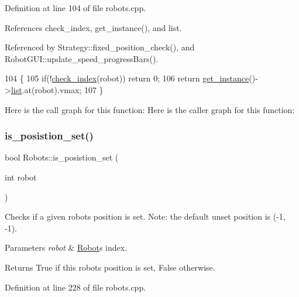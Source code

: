Definition at line 104 of file robots.\+cpp.



References check\+\_\+index, get\+\_\+instance(), and list.



Referenced by Strategy\+::fixed\+\_\+position\+\_\+check(), and Robot\+G\+U\+I\+::update\+\_\+speed\+\_\+progress\+Bars().


\begin{DoxyCode}
104                                     \{
105     \textcolor{keywordflow}{if}(!\hyperlink{robots_8hpp_ae3e6ae8f87cdc750c0b99bc609d9ae43}{check\_index}(robot)) \textcolor{keywordflow}{return} 0;
106     \textcolor{keywordflow}{return} \hyperlink{class_robots_a589bce74db5f34af384952d48435168f}{get\_instance}()->\hyperlink{class_robots_a2c6b77265028f82a4342ca1ef15ed305}{list}.at(robot).vmax;
107 \}
\end{DoxyCode}
Here is the call graph for this function\+:
Here is the caller graph for this function\+:
\mbox{\label{class_robots_ab1028283d9e734acfaa1bfb793a91ada}} 
\subsubsection{\texorpdfstring{is\+\_\+posistion\+\_\+set()}{is\_posistion\_set()}}
{\footnotesize\ttfamily bool Robots\+::is\+\_\+posistion\+\_\+set (\begin{DoxyParamCaption}\item[{int}]{robot }\end{DoxyParamCaption})\hspace{0.3cm}{\ttfamily [static]}}

Checks if a given robot\textquotesingle{}s position is set. Note\+: the default unset position is (-\/1, -\/1). 
\begin{DoxyParams}{Parameters}
{\em robot} & \hyperlink{struct_robots_1_1_robot}{Robot}\textquotesingle{}s index. \\
\hline
\end{DoxyParams}
\begin{DoxyReturn}{Returns}
True if this robot\textquotesingle{}s position is set, False otherwise. 
\end{DoxyReturn}


Definition at line 228 of file robots.\+cpp.



